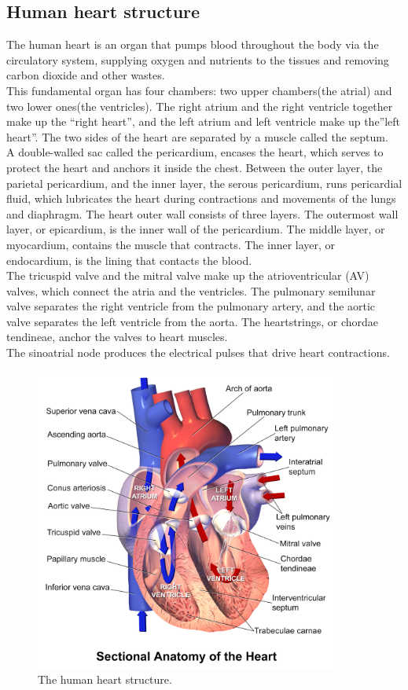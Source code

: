 \subsection{Human heart structure}
The human heart is an organ that pumps blood throughout the body via the circulatory system, supplying oxygen and nutrients to the tissues and removing carbon dioxide and other wastes.\\
This fundamental organ has four chambers: two upper chambers(the atrial) and two lower ones(the ventricles). The right atrium and the right ventricle together make up the “right heart”, and the left atrium and left ventricle make up the”left heart”. The two sides of the heart are separated by a muscle called the septum. \\
A double-walled sac called the pericardium, encases the heart, which serves to protect the heart and anchors it inside the chest. Between the outer layer, the parietal pericardium, and the inner layer, the serous pericardium, runs pericardial fluid, which lubricates the heart during contractions and movements of the lungs and diaphragm.
The heart outer wall consists of three layers. The outermost wall layer, or epicardium, is the inner wall of the pericardium.  The middle layer, or myocardium, contains the muscle that contracts. The inner layer, or endocardium, is the lining that contacts the blood.\\
The tricuspid valve and the mitral valve make up the atrioventricular (AV) valves, which connect the atria and the ventricles. The pulmonary semilunar valve separates the right ventricle from the pulmonary artery, and the aortic valve separates the left ventricle from the aorta. The heartstrings, or chordae tendineae, anchor the valves to heart muscles.\\
The sinoatrial node produces the electrical pulses that drive heart contractions.\\
\begin{figure}[ht!]
\centering
\includegraphics[width=100mm]{figures/ch2/1.png}
\caption{The human heart structure.\cite{ref1}}
\label{fig2.1}
\end{figure}

